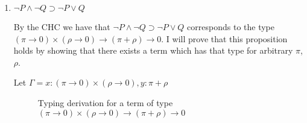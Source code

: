 \documentclass[10pt,\jkfside,a4paper]{article}
\begin{document}
\begin{enumerate}
\begin{enumerate}
        \begin{enumerate}

            \item $\neg P \land \neg Q \supset \neg P \vee Q$

            By the CHC we have that $\neg P \land \neg Q \supset \neg P \vee Q$ corresponds to the type $(\pi \to 0) \times (\rho \to 0) \to (\pi + \rho) \to 0$. I will prove that this proposition holds by
            showing that there exists a term which has that type for arbitrary $\pi$, $\rho$.

            Let $\Gamma = x: (\pi \to 0) \times (\rho \to 0), y: \pi + \rho$

            \begin{sidewaysfigure}

                \centering

                \begin{prooftree}
                \end{prooftree}

                \caption{Typing derivation for a term of type $(\pi \to 0) \times (\rho \to 0) \to (\pi + \rho) \to 0$}

            \end{sidewaysfigure}


\end{enumerate}
\end{enumerate}
\end{enumerate}
\end{document}
